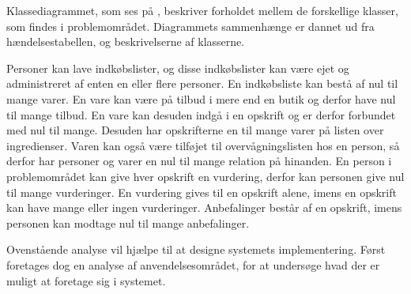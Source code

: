 Klassediagrammet, som ses på , beskriver forholdet mellem de forskellige klasser, som findes i problemområdet.
Diagrammets sammenhænge er dannet ud fra hændelsestabellen, og beskrivelserne af klasserne.

Personer kan lave indkøbslister, og disse indkøbslister kan være ejet og administreret af enten en eller flere personer.
En indkøbsliste kan bestå af nul til mange varer.
En vare kan være på tilbud i mere end en butik og derfor have nul til mange tilbud.
En vare kan desuden indgå i en opskrift og er derfor forbundet med nul til mange.
Desuden har opskrifterne en til mange varer på listen over ingredienser.
Varen kan også være tilføjet til overvågningslisten hos en person, så derfor har personer og varer en nul til mange relation på hinanden.
En person i problemområdet kan give hver opskrift en vurdering, derfor kan personen give nul til mange vurderinger.
En vurdering gives til en opskrift alene, imens en opskrift kan have mange eller ingen vurderinger.
Anbefalinger består af en opskrift, imens personen kan modtage nul til mange anbefalinger.

Ovenstående analyse vil hjælpe til at designe systemets implementering.
Først foretages dog en analyse af anvendelsesområdet, for at undersøge hvad der er muligt at foretage sig i systemet.
